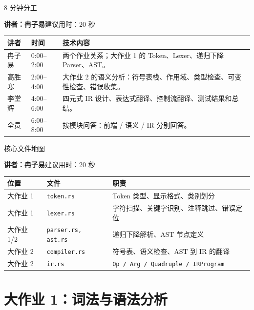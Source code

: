 \documentclass[aspectratio=169]{ctexbeamer}
\newcommand{\speaker}[2]{%
    \vspace{-0.4em}
    \begin{flushright}
        \scriptsize\color{mainblue}\textbf{讲者：#1}\quad 建议用时：#2
    \end{flushright}
    \vspace{-0.7em}
}
\begin{document}
\begin{frame}{8 分钟分工}
    \speaker{冉子易}{20 秒}
    \begin{table}
    \centering
    \small
    \begin{tabular}{p{2.2cm}p{2.0cm}p{7.6cm}}
        \toprule
        \textbf{讲者} & \textbf{时间} & \textbf{技术内容} \\
        \midrule
        冉子易 & 0:00--2:00 & 两个作业关系；大作业 1 的 Token、Lexer、递归下降 Parser、AST。\\
        高胜寒 & 2:00--4:00 & 大作业 2 的语义分析：符号表栈、作用域、类型检查、可变性检查、错误收集。\\
        李堂辉 & 4:00--6:00 & 四元式 IR 设计、表达式翻译、控制流翻译、测试结果和总结。\\
        全员 & 6:00--8:00 & 按模块问答：前端 / 语义 / IR 分别回答。\\
        \bottomrule
    \end{tabular}
    \end{table}
\end{frame}

\begin{frame}{核心文件地图}
    \speaker{冉子易}{20 秒}
    \begin{table}
    \centering
    \small
    \begin{tabular}{p{2.5cm}p{3.0cm}p{5.7cm}}
        \toprule
        \textbf{位置} & \textbf{文件} & \textbf{职责} \\
        \midrule
        大作业 1 & \texttt{token.rs} & Token 类型、显示格式、类别划分 \\
        大作业 1 & \texttt{lexer.rs} & 字符扫描、关键字识别、注释跳过、错误定位 \\
        大作业 1/2 & \texttt{parser.rs, ast.rs} & 递归下降解析、AST 节点定义 \\
        大作业 2 & \texttt{compiler.rs} & 符号表、语义检查、AST 到 IR 的翻译 \\
        大作业 2 & \texttt{ir.rs} & \texttt{Op / Arg / Quadruple / IRProgram} \\
        \bottomrule
    \end{tabular}
    \end{table}
\end{frame}

\section{大作业 1：词法与语法分析}
\end{document}
